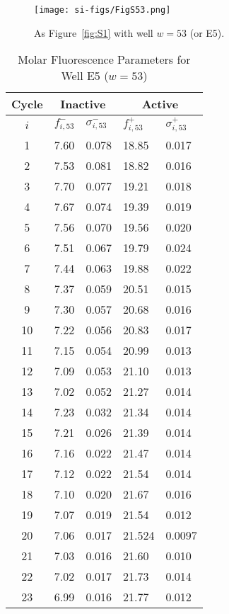                 \begin{figure}
                    \centering
                    \texttt{[image: si-figs/FigS53.png]}
                    \caption{
                        As Figure~\ref{fig:S1} with well $w=53$ (or E5).
                    }
                \end{figure}
                \clearpage
    \begin{table}
        \caption{Molar Fluorescence Parameters for Well E5 ($w=53$)}
        \centering
        \begin{tabular}{c|ll|ll}
            Cycle & \multicolumn{2}{c|}{Inactive} & \multicolumn{2}{c}{Active} \\
            \hline
            $i$ & $f_{i,53}^{-}$ & $\sigma_{i,53}^{-}$ &  $f_{i,53}^{+}$ & $\sigma_{i,53}^{+}$ \\
            \hline
    1 & 7.60 & 0.078 & 18.85 & 0.017 \\
2 & 7.53 & 0.081 & 18.82 & 0.016 \\
3 & 7.70 & 0.077 & 19.21 & 0.018 \\
4 & 7.67 & 0.074 & 19.39 & 0.019 \\
5 & 7.56 & 0.070 & 19.56 & 0.020 \\
6 & 7.51 & 0.067 & 19.79 & 0.024 \\
7 & 7.44 & 0.063 & 19.88 & 0.022 \\
8 & 7.37 & 0.059 & 20.51 & 0.015 \\
9 & 7.30 & 0.057 & 20.68 & 0.016 \\
10 & 7.22 & 0.056 & 20.83 & 0.017 \\
11 & 7.15 & 0.054 & 20.99 & 0.013 \\
12 & 7.09 & 0.053 & 21.10 & 0.013 \\
13 & 7.02 & 0.052 & 21.27 & 0.014 \\
14 & 7.23 & 0.032 & 21.34 & 0.014 \\
15 & 7.21 & 0.026 & 21.39 & 0.014 \\
16 & 7.16 & 0.022 & 21.47 & 0.014 \\
17 & 7.12 & 0.022 & 21.54 & 0.014 \\
18 & 7.10 & 0.020 & 21.67 & 0.016 \\
19 & 7.07 & 0.019 & 21.54 & 0.012 \\
20 & 7.06 & 0.017 & 21.524 & 0.0097 \\
21 & 7.03 & 0.016 & 21.60 & 0.010 \\
22 & 7.02 & 0.017 & 21.73 & 0.014 \\
23 & 6.99 & 0.016 & 21.77 & 0.012 \\

\end{tabular}
\end{table}
